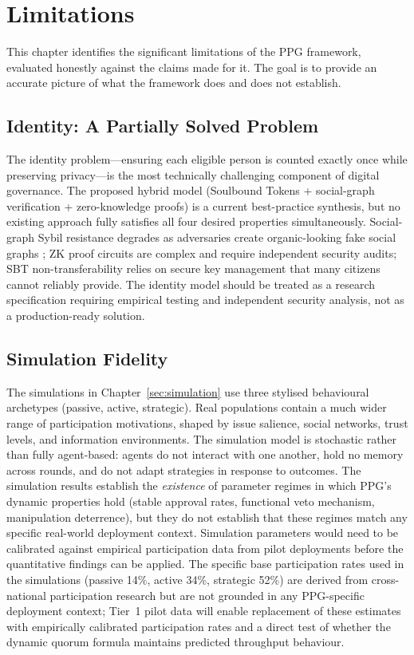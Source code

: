 \documentclass[12pt,a4paper,oneside]{report}
\begin{document}
\chapter{Limitations}
\label{sec:limitations}

This chapter identifies the significant limitations of the PPG framework, evaluated honestly against the claims made for it. The goal is to provide an accurate picture of what the framework does and does not establish.

\section{Identity: A Partially Solved Problem}

The identity problem---ensuring each eligible person is counted exactly once while preserving privacy---is the most technically challenging component of digital governance. The proposed hybrid model (Soulbound Tokens + social-graph verification + zero-knowledge proofs) is a current best-practice synthesis, but no existing approach fully satisfies all four desired properties simultaneously. Social-graph Sybil resistance degrades as adversaries create organic-looking fake social graphs \citep{douceur2002sybil}; ZK proof circuits are complex and require independent security audits; SBT non-transferability relies on secure key management that many citizens cannot reliably provide. The identity model should be treated as a research specification requiring empirical testing and independent security analysis, not as a production-ready solution.

\section{Simulation Fidelity}

The simulations in Chapter~\ref{sec:simulation} use three stylised behavioural archetypes (passive, active, strategic). Real populations contain a much wider range of participation motivations, shaped by issue salience, social networks, trust levels, and information environments. The simulation model is stochastic rather than fully agent-based: agents do not interact with one another, hold no memory across rounds, and do not adapt strategies in response to outcomes. The simulation results establish the \emph{existence} of parameter regimes in which PPG's dynamic properties hold (stable approval rates, functional veto mechanism, manipulation deterrence), but they do not establish that these regimes match any specific real-world deployment context. Simulation parameters would need to be calibrated against empirical participation data from pilot deployments before the quantitative findings can be applied. The specific base participation rates used in the simulations (passive 14\%, active 34\%, strategic 52\%) are derived from cross-national participation research but are not grounded in any PPG-specific deployment context; Tier~1 pilot data will enable replacement of these estimates with empirically calibrated participation rates and a direct test of whether the dynamic quorum formula maintains predicted throughput behaviour.
\end{document}
